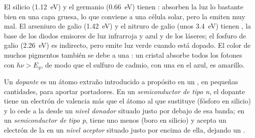 El silicio (\qty{1.12}{eV}) y el germanio (\qty{0.66}{eV}) tienen :
absorben la luz lo bastante bien en una capa gruesa, lo que conviene a una célula solar, pero
la emiten muy mal. El arseniuro de galio (\qty{1.42}{eV}) y el nitruro de galio (unos
\qty{3.4}{eV}) tienen , la base de los diodos emisores de luz infrarroja y
azul y de los láseres; el fosfuro de galio (\qty{2.26}{eV}) es indirecto, pero emite luz verde
cuando está dopado. El color de muchos pigmentos también se debe a una : un cristal
absorbe todos los fotones con $h\nu > E_g$, de modo que el sulfuro de cadmio, con una  en el azul,
es amarillo.

\begin{definition}[Dopado]\label{def:b3:solid-state:doping}
Un \emph{dopante} es un átomo extraño introducido a propósito en un ,
en pequeñas cantidades, para aportar portadores. En un \emph{semiconductor de
tipo n}, el dopante tiene un electrón de valencia más
que el átomo al que sustituye (fósforo en silicio) y lo cede a la
 desde un \emph{nivel donador} situado justo por debajo de esa
banda; en un \emph{semiconductor de tipo p}, tiene uno
menos (boro en silicio) y acepta un electrón de la  en un
\emph{nivel aceptor} situado justo por encima de ella, dejando un .
\end{definition}

